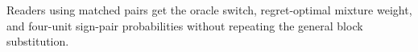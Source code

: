 Readers using matched pairs get the oracle switch, regret-optimal mixture weight, and four-unit sign-pair probabilities without repeating the general block substitution.